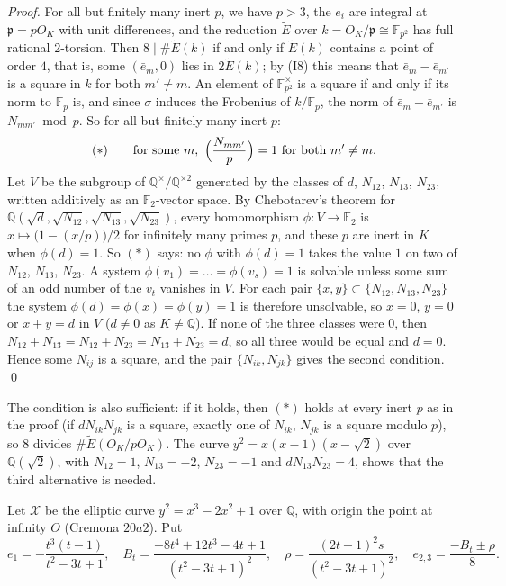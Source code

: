\documentclass[11pt]{article}
\newcommand{\Q}{\mathbb Q}
\newcommand{\F}{\mathbb F}
\begin{document}
\emph{Proof.} For all but finitely many inert \(p\), we have \(p>3\), the \(e_i\) are integral
at \(\mathfrak p=pO_K\) with unit differences, and the reduction
\(\widetilde E\) over \(k=O_K/\mathfrak p\cong\F_{p^2}\) has full rational \(2\)-torsion. Then
\(8\mid\#\widetilde E(k)\) if and only if \(\widetilde E(k)\) contains a point of order \(4\),
that is, some \((\bar e_m,0)\) lies in \(2\widetilde E(k)\); by (I8) this means that
\(\bar e_m-\bar e_{m'}\) is a square in \(k\) for both \(m'\neq m\). An element of
\(\F_{p^2}^\times\) is a square if and only if its norm to \(\F_p\) is, and since \(\sigma\)
induces the Frobenius of \(k/\F_p\), the norm of \(\bar e_m-\bar e_{m'}\) is \(N_{mm'}\bmod p\).
So for all but finitely many inert \(p\):
\[(\ast)\qquad\text{for some }m,\ \Bigl(\frac{N_{mm'}}{p}\Bigr)=1\text{ for both }m'\neq m .\]
Let \(V\) be the subgroup of \(\Q^\times/\Q^{\times2}\) generated by the classes of \(d\),
\(N_{12}\), \(N_{13}\), \(N_{23}\), written additively as an \(\F_2\)-vector space. By Chebotarev's
theorem for \(\Q(\sqrt d,\sqrt{N_{12}},\sqrt{N_{13}},\sqrt{N_{23}})\), every homomorphism
\(\phi:V\to\F_2\) is \(x\mapsto\bigl(1-(x/p)\bigr)/2\) for infinitely many primes \(p\), and these
\(p\) are inert in \(K\) when \(\phi(d)=1\). So \((\ast)\) says: no \(\phi\) with \(\phi(d)=1\)
takes the value \(1\) on two of \(N_{12}\), \(N_{13}\), \(N_{23}\). A system \(\phi(v_1)=\dots=
\phi(v_s)=1\) is solvable unless some sum of an odd number of the \(v_t\) vanishes in \(V\). For
each pair \(\{x,y\}\subset\{N_{12},N_{13},N_{23}\}\) the system \(\phi(d)=\phi(x)=\phi(y)=1\) is
therefore unsolvable, so \(x=0\), \(y=0\) or \(x+y=d\) in \(V\) (\(d\neq0\) as \(K\neq\Q\)). If
none of the three classes were \(0\), then \(N_{12}+N_{13}=N_{12}+N_{23}=N_{13}+N_{23}=d\), so
all three would be equal and \(d=0\). Hence some \(N_{ij}\) is a square, and the pair
\(\{N_{ik},N_{jk}\}\) gives the second condition. \qed

\medskip
The condition is also sufficient: if it holds, then \((\ast)\) holds at every inert \(p\) as in
the proof (if \(dN_{ik}N_{jk}\) is a square, exactly one of \(N_{ik}\), \(N_{jk}\) is a square
modulo \(p\)), so \(8\) divides \(\#\widetilde E(O_K/pO_K)\). The curve
\(y^2=x(x-1)(x-\sqrt2)\) over \(\Q(\sqrt2)\), with \(N_{12}=1\), \(N_{13}=-2\), \(N_{23}=-1\) and
\(dN_{13}N_{23}=4\), shows that the third alternative is needed.

\medskip
Let \(\mathcal X\) be the elliptic curve \(y^2=x^3-2x^2+1\) over \(\Q\), with origin the point at
infinity \(O\) (Cremona \(20a2\)). Put
\[
e_1=-\frac{t^3(t-1)}{t^2-3t+1},\quad
B_t=\frac{-8t^4+12t^3-4t+1}{(t^2-3t+1)^2},\quad
\rho=\frac{(2t-1)^2s}{(t^2-3t+1)^2},\quad
e_{2,3}=\frac{-B_t\pm\rho}{8}.
\]
\end{document}
